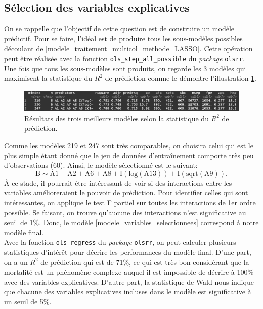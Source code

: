 \documentclass{article}
\begin{document}
	\subsection{Sélection des variables explicatives}
	On se rappelle que l'objectif de cette question est de construire un modèle prédictif. Pour se faire, l'idéal est de produire tous les sous-modèles possibles découlant de \eqref{modele_traitement_multicol_methode_LASSO}.
	Cette opération peut être réalisée avec la fonction \texttt{ols\_step\_all\_possible} du \textit{package} \texttt{olsrr}. Une fois que tous les sous-modèles sont produits, on regarde les 3 modèles qui maximisent la statistique du $R^2$ de prédiction comme le démontre l'illustration \ref{Qst1_all_possible_models_top3}.
	\begin{figure}[H]
		\centering
		\includegraphics[width=\textwidth]{graphiques/Qst1_all_possible_models_top3}
		\caption{Résultats des trois meilleurs modèles selon la statistique du $R^2$ de prédiction.}
		\label{Qst1_all_possible_models_top3}
	\end{figure}
	Comme les modèles 219 et 247 sont très comparables, on choisira celui qui est le plus simple étant donné que le jeu de données d'entraînement comporte très peu d'observations (60). Ainsi, le modèle sélectionné est le suivant:
	\begin{equation}\label{modele_variables_selectionnees}
		\mathrm{B} \sim \mathrm{A1 + A2 + A6 + A8 + I(log(A13)) + I(sqrt(A9))}.
	\end{equation}
	À ce stade, il pourrait être intéressant de voir si des interactions entre les variables amélioreraient le pouvoir de prédiction. Pour identifier celles qui sont intéressantes, on applique le test F partiel sur toutes les interactions de 1er ordre possible. Se faisant, on trouve qu'aucune des interactions n'est significative au seuil de 1\%. Donc, le modèle \eqref{modele_variables_selectionnees} correspond à notre modèle final.\\
	
	Avec la fonction \texttt{ols\_regress} du \textit{package} \texttt{olsrr}, on peut calculer plusieurs statistiques d'intérêt pour décrire les performances du modèle final. D'une part, on a un $R^2$ de prédiction qui est de 71\%, ce qui est très bon considérant que la mortalité est un phénomène complexe auquel il est impossible de décrire à 100\% avec des variables explicatives. D'autre part, la statistique de Wald nous indique que chacune des variables explicatives incluses dans le modèle est significative à un seuil de 5\%.
	
\end{document}

